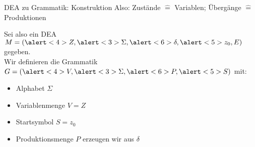 \begin{frame}{DEA zu Grammatik: Konstruktion}
    Also: \alert<4-5>{Zustände $\hat{=}$ Variablen}; \alert<6>{Übergänge $\hat{=}$ Produktionen}
    
    Sei also ein \alert<2>{DEA $M = (\alert<4>{Z}, \alert<3>{\Sigma}, \alert<6>{\delta}, \alert<5>{z_0}, E)$} gegeben. \\
    Wir definieren die \alert<2>{Grammatik $G = (\alert<4>{V}, \alert<3>{\Sigma}, \alert<6>{P}, \alert<5>{S})$} mit:
    \begin{itemize}
        \item<3- | alert@3> Alphabet $\Sigma$
        \item<4- | alert@4> Variablenmenge $V = Z$
        \item<5- | alert@5> Startsymbol $S = z_0$
        \item<6- | alert@6> Produktionsmenge $P$ erzeugen wir aus $\delta$
    \end{itemize}
\end{frame}

